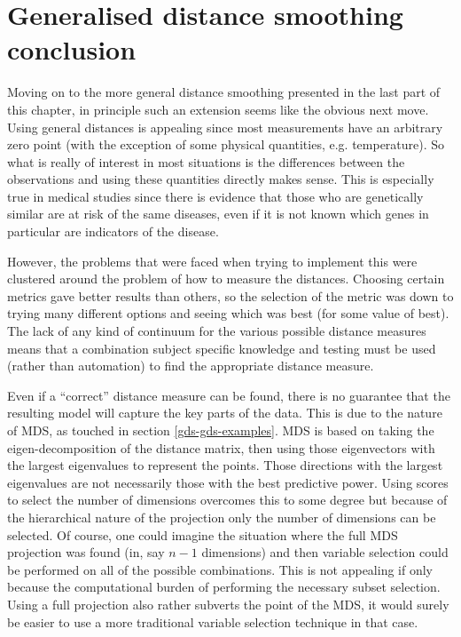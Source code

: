 \section{Generalised distance smoothing conclusion}
\label{fasend-gds-conc}

Moving on to the more general distance smoothing presented in the last part of this chapter, in principle such an extension seems like the obvious next move. Using general distances is appealing since most measurements have an arbitrary zero point (with the exception of some physical quantities, e.g. temperature). So what is really of interest in most situations is the differences between the observations and using these quantities directly makes sense. This is especially true in medical studies since there is evidence that those who are genetically similar are at risk of the same diseases, even if it is not known which genes in particular are indicators of the disease.

However, the problems that were faced when trying to implement this were clustered around the problem of how to measure the distances. Choosing certain metrics gave better results than others, so the selection of the metric was down to trying many different options and seeing which was best (for some value of best). The lack of any kind of continuum for the various possible distance measures means that a combination subject specific knowledge and testing must be used (rather than automation) to find the appropriate distance measure.

Even if a ``correct'' distance measure can be found, there is no guarantee that the resulting model will capture the key parts of the data. This is due to the nature of MDS, as touched in section \ref{gds-gds-examples}. MDS is based on taking the eigen-decomposition of the distance matrix, then using those eigenvectors with the largest eigenvalues to represent the points. Those directions with the largest eigenvalues are not necessarily those with the best predictive power. Using scores to select the number of dimensions overcomes this to some degree but because of the hierarchical nature of the projection only the number of dimensions can be selected. Of course, one could imagine the situation where the full MDS projection was found (in, say $n-1$ dimensions) and then variable selection could be performed on all of the possible combinations. This is not appealing if only because the computational burden of performing the necessary subset selection. Using a full projection also rather subverts the point of the MDS, it would surely be easier to use a more traditional variable selection technique in that case.

